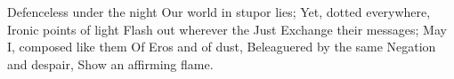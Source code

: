 \begin{poem}
                             Defenceless under the night
                             Our world in stupor lies;
                             Yet, dotted everywhere,
                             Ironic points of light
                             Flash out wherever the Just
                             Exchange their messages;
                             May I, composed like them
                             Of Eros and of dust,
                             Beleaguered by the same
                             Negation and despair,
                             Show an affirming flame.
\end{poem}



































